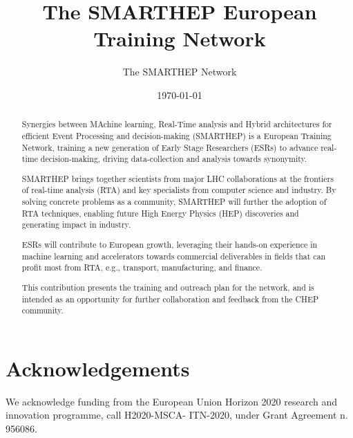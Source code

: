 \documentclass{smarthepnote}
\title{The SMARTHEP European Training Network}
\author{The SMARTHEP Network}
\date{\today}
\begin{document}
\maketitle

\begin{abstract}
    Synergies between MAchine learning, Real-Time analysis and Hybrid architectures for efficient Event Processing and decision-making (SMARTHEP) is a European Training Network, training a new generation of Early Stage Researchers (ESRs) to advance real-time decision-making, driving data-collection and analysis towards synonymity.

    SMARTHEP brings together scientists from major LHC collaborations at the frontiers of real-time analysis (RTA) and key specialists from computer science and industry. By solving concrete problems as a community, SMARTHEP will further the adoption of RTA techniques, enabling future High Energy Physics (HEP) discoveries and generating impact in industry.

    ESRs will contribute to European growth, leveraging their hands-on experience in machine learning and accelerators towards commercial deliverables in fields that can profit most from RTA, e.g., transport, manufacturing, and finance.

    This contribution presents the training and outreach plan for the network, and is intended as an opportunity for further collaboration and feedback from the CHEP community.
\end{abstract}

\vfill
\makereviewtable
\clearpage

















\printbibliography

\section*{Acknowledgements}
We acknowledge funding from the European Union Horizon 2020 research and innovation programme, call H2020-MSCA- ITN-2020, under Grant Agreement n. 956086.
\end{document}
